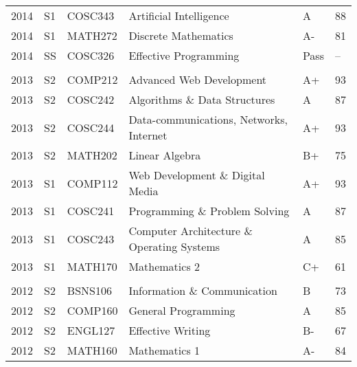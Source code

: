 \documentclass[a4paper, oneside, final]{scrartcl}
\begin{document}
\begin{table}[h]
\begin{tabular}{llllll}
        2014 & S1  & COSC343 & Artificial Intelligence                         & A     & 88      \\
        2014 & S1  & MATH272 & Discrete Mathematics                            & A-    & 81      \\
        2014 & SS  & COSC326 & Effective Programming                           & Pass  & --      \\
             &     &         &                                                 &       &         \\
        2013 & S2  & COMP212 & Advanced Web Development                        & A+    & 93      \\
        2013 & S2  & COSC242 & Algorithms \& Data Structures                   & A     & 87      \\
        2013 & S2  & COSC244 & Data-communications, Networks, Internet         & A+    & 93      \\
        2013 & S2  & MATH202 & Linear Algebra                                  & B+    & 75      \\
        2013 & S1  & COMP112 & Web Development \& Digital Media                & A+    & 93      \\
        2013 & S1  & COSC241 & Programming \& Problem Solving                  & A     & 87      \\
        2013 & S1  & COSC243 & Computer Architecture \& Operating Systems      & A     & 85      \\
        2013 & S1  & MATH170 & Mathematics 2                                   & C+    & 61      \\
             &     &         &                                                 &       &         \\
        2012 & S2  & BSNS106 & Information \& Communication                    & B     & 73      \\
        2012 & S2  & COMP160 & General Programming                             & A     & 85      \\
        2012 & S2  & ENGL127 & Effective Writing                               & B-    & 67      \\
        2012 & S2  & MATH160 & Mathematics 1                                   & A-    & 84      \\
        \end{tabular}
      \end{table}
    \fi
\end{document}
